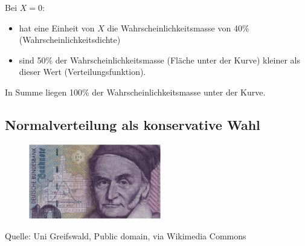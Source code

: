 \documentclass[
  a4paper,
  DIV=11]{scrreprt}
\providecommand{\tightlist}{%
  \setlength{\itemsep}{0pt}\setlength{\parskip}{0pt}}\usepackage{longtable,booktabs,array}
\theoremstyle{definition}
\theoremstyle{remark}
\begin{document}
Bei \(X=0\):

\begin{itemize}
\tightlist
\item
  hat eine Einheit von \(X\) die Wahrscheinlichkeitsmasse von 40\%
  (Wahrscheinlichkeitsdichte)
\item
  sind 50\% der Wahrscheinlichkeitsmasse (Fläche unter der Kurve)
  kleiner als dieser Wert (Verteilungsfunktion).
\end{itemize}

In Summe liegen 100\% der Wahrscheinlichkeitsmasse unter der Kurve.

\hypertarget{normalverteilung-als-konservative-wahl}{%
\subsection{Normalverteilung als konservative
Wahl}\label{normalverteilung-als-konservative-wahl}}

\begin{figure}

{\centering \includegraphics[width=2.27in,height=\textheight]{./img/10_Deutsche_Mark_-_detail.png}

}

\end{figure}

Quelle: Uni Greifswald, Public domain, via Wikimedia Commons
\end{document}
